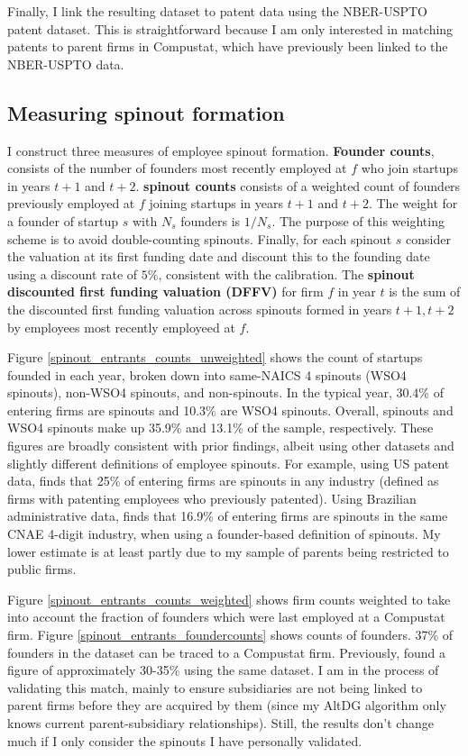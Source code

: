 \documentclass[11pt,english]{article}
\theoremstyle{remark}
\begin{document}
Finally, I link the resulting dataset to patent data using the NBER-USPTO patent dataset. This is straightforward because I am only interested in matching patents to parent firms in Compustat, which have previously been linked to the NBER-USPTO data.

\subsection{Measuring spinout formation}

I construct three measures of employee spinout formation. \textbf{Founder counts}, consists of the number of founders most recently employed at $f$ who join startups in years $t+1$ and $t+2$. \textbf{spinout counts} consists of a weighted count of founders previously employed at $f$ joining startups in years $t+1$ and $t+2$. The weight for a founder of startup $s$ with $N_s$ founders is $1/N_s$. The purpose of this weighting scheme is to avoid double-counting spinouts. Finally, for each spinout $s$ consider the valuation at its first funding date and discount this to the founding date using a discount rate of $5\%$, consistent with the calibration. The \textbf{spinout discounted first funding valuation (DFFV)} for firm $f$ in year $t$ is the sum of the discounted first funding valuation across spinouts formed in years $t+1,t+2$ by employees most recently employeed at $f$. 

Figure \ref{spinout_entrants_counts_unweighted} shows the count of startups founded in each year, broken down into same-NAICS 4 spinouts (WSO4 spinouts), non-WSO4 spinouts, and non-spinouts. In the typical year, 30.4\% of entering firms are spinouts and 10.3\% are WSO4 spinouts. Overall, spinouts and WSO4 spinouts make up 35.9\% and 13.1\% of the sample, respectively. These figures are broadly consistent with prior findings, albeit using other datasets and slightly different definitions of employee spinouts. For example, using US patent data, \cite{baslandze_spinout_2019} finds that 25\% of entering firms are spinouts in any industry (defined as firms with patenting employees who previously patented). Using Brazilian administrative data, \cite{muendler_employee_2012} finds that 16.9\% of entering firms are spinouts in the same CNAE 4-digit industry, when using a founder-based definition of spinouts. My lower estimate is at least partly due to my sample of parents being restricted to public firms. 

Figure \ref{spinout_entrants_counts_weighted} shows firm counts weighted to take into account the fraction of founders which were last employed at a Compustat firm. Figure \ref{spinout_entrants_foundercounts} shows counts of founders. 37\% of founders in the dataset can be traced to a Compustat firm. Previously, \cite{gompers_entrepreneurial_2005} found a figure of approximately 30-35\% using the same dataset. I am in the process of validating this match, mainly to ensure subsidiaries are not being linked to parent firms before they are acquired by them (since my AltDG algorithm only knows current parent-subsidiary relationships). Still, the results don't change much if I only consider the spinouts I have personally validated.
\end{document}
